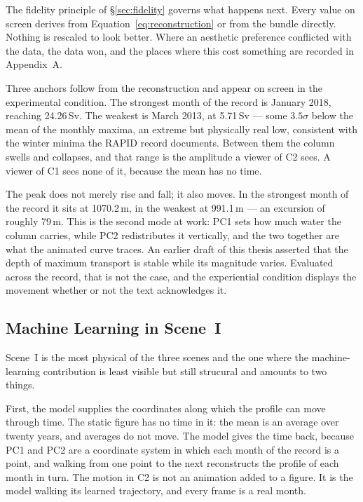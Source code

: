 The fidelity principle of \S\ref{sec:fidelity} governs what happens next. Every value on screen derives from Equation~\ref{eq:reconstruction} or from the bundle directly. Nothing is rescaled to look better. Where an aesthetic preference conflicted with the data, the data won, and the places where this cost something are recorded in Appendix~A.

Three anchors follow from the reconstruction and appear on screen in the experimental condition. The strongest month of the record is January 2018, reaching 24.26\,Sv. The weakest is March 2013, at 5.71\,Sv --- some $3.5\sigma$ below the mean of the monthly maxima, an extreme but physically real low, consistent with the winter minima the RAPID record documents. Between them the column swells and collapses, and that range is the amplitude a viewer of C2 sees. A viewer of C1 sees none of it, because the mean has no time.

The peak does not merely rise and fall; it also moves. In the strongest month of the record it sits at 1070.2\,m, in the weakest at 991.1\,m --- an excursion of roughly 79\,m. This is the second mode at work: PC1 sets how much water the column carries, while PC2 redistributes it vertically, and the two together are what the animated curve traces. An earlier draft of this thesis asserted that the depth of maximum transport is stable while its magnitude varies. Evaluated across the record, that is not the case, and the experiential condition displays the movement whether or not the text acknowledges it.

\subsection{Machine Learning in Scene~I}
\label{subsec:column-ml}

Scene~I is the most physical of the three scenes and the one where the machine-learning contribution is least visible but still strucural and amounts to two things. 

First, the model supplies the coordinates along which the profile can move through time. The static figure has no time in it: the mean is an average over twenty years, and averages do not move. The model gives the time back, because PC1 and PC2 are a coordinate system in which each month of the record is a point, and walking from one point to the next reconstructs the profile of each month in turn. The motion in C2 is not an animation added to a figure. It is the model walking its learned trajectory, and every frame is a real month.

